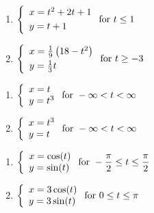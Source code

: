 \begin{multicols}{2} \raggedcolumns 
\begin{enumerate}
\setcounter{enumi}{\value{HW}}
\item ${\displaystyle \left\{ \begin{array}{l} x = t^2+2t+1 \\[3pt] y = t+1 \end{array} \right. \vspace{.25in} \mbox{for } t \leq 1}$
\item ${\displaystyle \left\{ \begin{array}{l} x = \frac{1}{9}\left(18-t^2\right) \\[3pt] y = \frac{1}{3} t \end{array} \right. \vspace{.25in} \mbox{for } t \geq -3}$

\setcounter{HW}{\value{enumi}}
\end{enumerate}
\end{multicols}


\begin{multicols}{2} \raggedcolumns 
\begin{enumerate}
\setcounter{enumi}{\value{HW}}

\item ${\displaystyle \left\{ \begin{array}{l} x = t \\ y = t^3 \end{array} \right. \vspace{.25in} \mbox{for } -\infty < t < \infty}$
\item ${\displaystyle \left\{ \begin{array}{l} x = t^3 \\ y = t \end{array} \right. \vspace{.25in} \mbox{for } -\infty < t < \infty}$

\setcounter{HW}{\value{enumi}}
\end{enumerate}
\end{multicols}

\begin{multicols}{2} \raggedcolumns 
\begin{enumerate}
\setcounter{enumi}{\value{HW}}
\item ${\displaystyle \left\{ \begin{array}{l} x = \cos(t) \\ y = \sin(t) \end{array} \right. \vspace{.25in} \mbox{for } -\dfrac{\pi}{2} \leq t \leq \dfrac{\pi}{2}}$
\item ${\displaystyle \left\{ \begin{array}{l} x = 3\cos(t) \\ y = 3\sin(t) \end{array} \right. \vspace{.25in} \mbox{for } 0 \leq t \leq \pi}$


\setcounter{HW}{\value{enumi}}
\end{enumerate}
\end{multicols}



